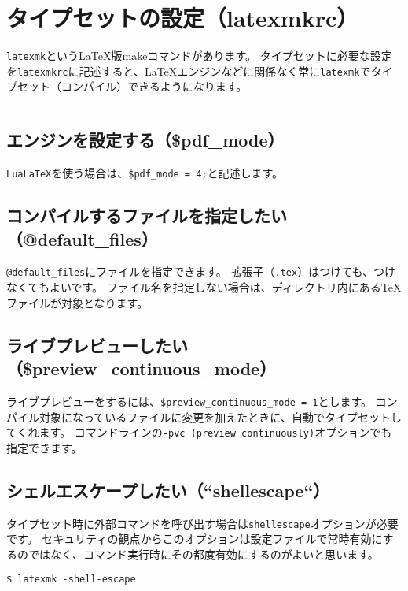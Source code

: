 \section{タイプセットの設定（latexmkrc）}

\texttt{latexmk}というLaTeX版makeコマンドがあります。
タイプセットに必要な設定を\texttt{latexmkrc}に記述すると、LaTeXエンジンなどに関係なく常に\texttt{latexmk}でタイプセット（コンパイル）できるようになります。

\inputminted{bash}{latexmkrc}

\subsection{エンジンを設定する（\$pdf\_mode）}

\texttt{LuaLaTeX}を使う場合は、\texttt{\$pdf\_mode = 4;}と記述します。

\subsection{コンパイルするファイルを指定したい（@default\_files）}

\texttt{@default\_files}にファイルを指定できます。
拡張子（\texttt{.tex}）はつけても、つけなくてもよいです。
ファイル名を指定しない場合は、ディレクトリ内にあるTeXファイルが対象となります。

\subsection{ライブプレビューしたい（\$preview\_continuous\_mode）}

ライブプレビューをするには、\texttt{\$preview\_continuous\_mode = 1}とします。
コンパイル対象になっているファイルに変更を加えたときに、自動でタイプセットしてくれます。
コマンドラインの\texttt{-pvc (preview continuously)}オプションでも指定できます。

\subsection{シェルエスケープしたい（``\-shell\-escape``）}

タイプセット時に外部コマンドを呼び出す場合は\texttt{\-shell\-escape}オプションが必要です。
セキュリティの観点からこのオプションは設定ファイルで常時有効にするのではなく、コマンド実行時にその都度有効にするのがよいと思います。

\begin{verbatim}
$ latexmk -shell-escape
\end{verbatim}
